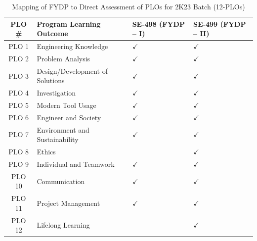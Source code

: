 \begin{table}[H]
\centering
\footnotesize %
\renewcommand{\arraystretch}{0.85} %
\caption{Mapping of FYDP to Direct Assessment of PLOs for 2K23 Batch (12-PLOs)}
\label{tab:Mapping_of_FYDP_to_Direct_Assessment_of_PLOs-12}
\begin{tabular}{c >{\raggedright\arraybackslash}p{} >{\centering\arraybackslash}p{} >{\centering\arraybackslash}p{}}
\toprule
\textbf{PLO \#} & \textbf{Program Learning Outcome} & \textbf{SE-498 (FYDP -- I)} & \textbf{SE-499 (FYDP -- II)} \\
\midrule
PLO 1  & Engineering Knowledge              & $\checkmark$ & $\checkmark$ \\
PLO 2  & Problem Analysis                   & $\checkmark$ & $\checkmark$ \\
PLO 3  & Design/Development of Solutions    & $\checkmark$ & $\checkmark$ \\
PLO 4  & Investigation                      & $\checkmark$ & $\checkmark$ \\
PLO 5  & Modern Tool Usage                  & $\checkmark$ & $\checkmark$ \\
PLO 6  & Engineer and Society      & $\checkmark$ & $\checkmark$ \\
PLO 7  & Environment and Sustainability        & $\checkmark$ & $\checkmark$ \\
PLO 8  & Ethics                             &  & $\checkmark$ \\
PLO 9  & Individual and Teamwork            & $\checkmark$ & $\checkmark$ \\
PLO 10  & Communication                      & $\checkmark$ & $\checkmark$ \\
PLO 11 & Project Management                 & $\checkmark$ & $\checkmark$ \\
PLO 12 & Lifelong Learning                  &              & $\checkmark$ \\
\bottomrule
\end{tabular}
\end{table}

